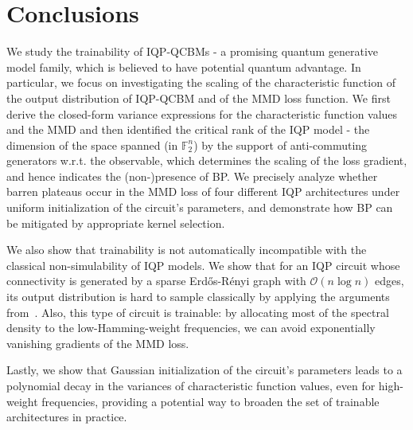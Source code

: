 \documentclass{article}
\theoremstyle{plain}
\theoremstyle{definition}
\theoremstyle{remark}
\begin{document}
\section{Conclusions}
\label{sec:conclusion}
We study the trainability of IQP-QCBMs - a promising quantum generative model family, which is believed to have potential quantum advantage. In particular, we focus on investigating the scaling of the characteristic function of the output distribution of IQP-QCBM and of the MMD loss function.
We first derive the closed-form variance expressions for the characteristic function values and the MMD and then identified the critical rank of the IQP model - the dimension of the space spanned (in $\mathbb{F}_2^n$) by the support of anti-commuting generators w.r.t. the observable, which determines the scaling of the loss gradient, and hence indicates the (non-)presence of BP. We precisely analyze whether barren plateaus occur in the MMD loss of four different IQP architectures under uniform initialization of the circuit's parameters, and demonstrate how BP can be mitigated by appropriate kernel selection.

We also show that trainability is not automatically incompatible with the classical non-simulability of IQP models. We show that for an IQP circuit whose connectivity is generated by a sparse Erd\H os-R\'enyi graph with $\mathcal{O}(n\log n)$ edges, its output distribution is hard to sample classically by applying the arguments from~\cite{Bremner17}. Also, this type of circuit is trainable: by allocating most of the spectral density to the low-Hamming-weight frequencies, we can avoid exponentially vanishing gradients of the MMD loss.

Lastly, we show that Gaussian initialization of the circuit's parameters leads to a polynomial decay in the variances of characteristic function values, even for high-weight frequencies, providing a potential way to broaden the set of trainable architectures in practice.




\end{document}

